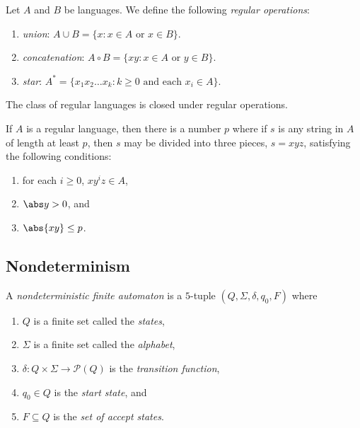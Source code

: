 \documentclass{article}
\begin{document}
\begin{definition}[Sipser p. 44]
	Let $A$ and $B$ be languages. We define the following \emph{regular operations}:
	\begin{enumerate}
		\item \emph{union}: $A\cup B=\{x : x \in A \text{ or } x \in B\}$.
		\item \emph{concatenation}: $A\circ B=\{xy : x \in A \text{ or } y \in B\}$.
		\item \emph{star}: $A^* = \{x_1x_2\dots x_k:k\geq 0 \text{ and each }x_i\in A\}$.
	\end{enumerate}
\end{definition}

\begin{theorem}[Sipser p. 45, 60, 62]
	The class of regular languages is closed under regular operations.
\end{theorem}

\begin{theorem}
	If $A$ is a regular language, then there is a number $p$ where if $s$
	is any string in $A$ of length at least $p$, then $s$ may be divided
	into three pieces, $s=xyz$, satisfying the following conditions:
	\begin{enumerate}
		\item for each $i\geq 0$, $xy^iz\in A$,
		\item $\abs y > 0$, and
		\item $\abs{xy} \leq p$.
	\end{enumerate}
\end{theorem}

\subsection{Nondeterminism}

\begin{definition}
	A \emph{nondeterministic finite automaton} is a $5$-tuple $(Q,\Sigma,\delta,q_0,F)$ where
	\begin{enumerate}
		\item $Q$ is a finite set called the \emph{states},
		\item $\Sigma$ is a finite set called the \emph{alphabet},
		\item $\delta:Q\times\Sigma\to\mathcal{P}(Q)$ is the \emph{transition function},
		\item $q_0\in Q$ is the \emph{start state}, and
		\item $F\subseteq Q$ is the \emph{set of accept states}.
	\end{enumerate}
\end{definition}
\end{document}
